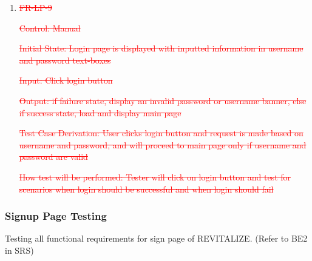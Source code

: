 \documentclass[12pt, titlepage]{article}
\begin{document}
\begin{enumerate}
\item{\textcolor{red}{\sout{FR-LP-9}}\\}
	
\textcolor{red}{\sout{Control: Manual}}

\textcolor{red}{\sout{Initial State: Login page is displayed with inputted information in username and password text-boxes}}

\textcolor{red}{\sout{Input: Click login button}}

\textcolor{red}{\sout{Output: if failure state, display an invalid password or username banner, else if success state, load and display main page}}

\textcolor{red}{\sout{Test Case Derivation: User clicks login button and request is made based on username and password, and will proceed to main page only if username and password are valid}}

\textcolor{red}{\sout{How test will be performed: Tester will click on login button and test for scenarios when login should be successful and when login should fail}}
	
	
\end{enumerate}

\subsubsection{Signup Page Testing}

Testing all functional requirements for sign page of REVITALIZE. (Refer to BE2 in SRS)
\end{document}
